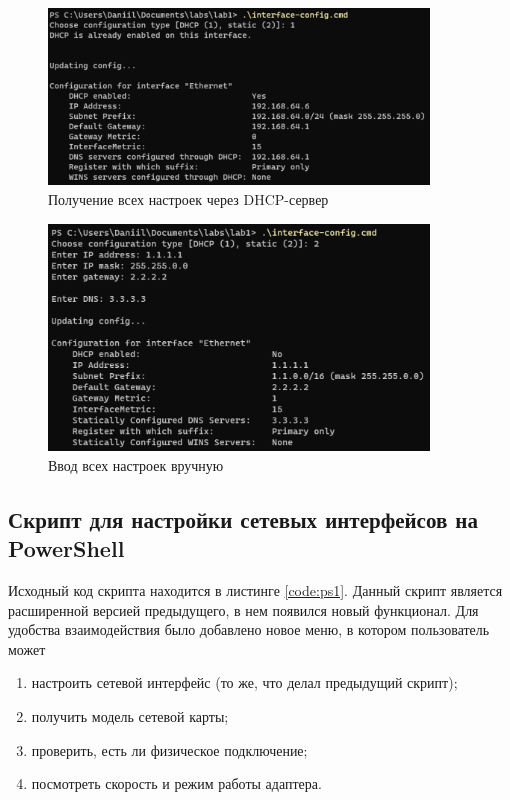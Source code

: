 \documentclass[a4paper, 14pt]{extarticle}
\begin{document}
\begin{figure}[H]
  \centering
  \includegraphics[width=0.9\textwidth]{images/cmd/dhcp.png}
  \caption{Получение всех настроек через DHCP-сервер}
  \label{fig:cmd-dhcp}
\end{figure}

\begin{figure}[H]
  \centering
  \includegraphics[width=0.9\textwidth]{images/cmd/static.png}
  \caption{Ввод всех настроек вручную}
  \label{fig:cmd-static}
\end{figure}

\subsection{Скрипт для настройки сетевых интерфейсов на PowerShell}

Исходный код скрипта находится в листинге \ref{code:ps1}. Данный скрипт
является расширенной версией предыдущего, в нем появился новый функционал. Для
удобства взаимодействия было добавлено новое меню, в котором пользователь может
\begin{enumerate}
  \item настроить сетевой интерфейс (то же, что делал предыдущий скрипт);
  \item получить модель сетевой карты;
  \item проверить, есть ли физическое подключение;
  \item посмотреть скорость и режим работы адаптера.
\end{enumerate}
\end{document}
